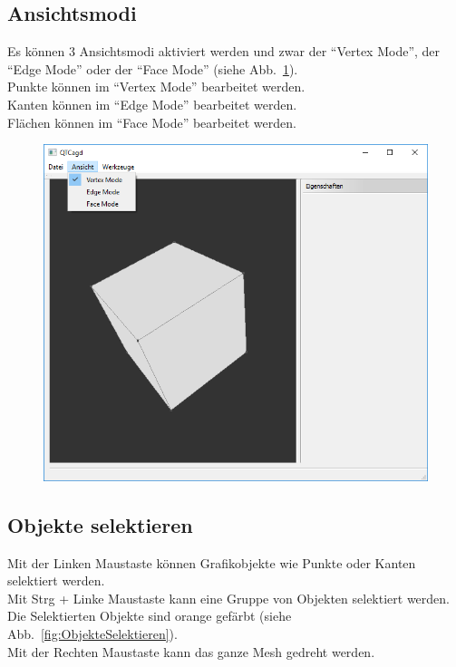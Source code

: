 \subsection{Ansichtsmodi}
Es können 3 Ansichtsmodi aktiviert werden und zwar der "`Vertex Mode"', der "`Edge Mode"' oder der "`Face Mode"' (siehe Abb.~\ref{fig:Ansichtsmodi}).\\
Punkte können im "`Vertex Mode"' bearbeitet werden.\\
Kanten können im "`Edge Mode"' bearbeitet werden.\\
Flächen können im "`Face Mode"' bearbeitet werden.

\begin{figure}[H]
	\centering
	\includegraphics[scale=0.5]{content/pictures/2-Ansichtsmodi}
	\caption{}
	\label{fig:Ansichtsmodi}
\end{figure}

\subsection{Objekte selektieren}
Mit der Linken Maustaste können Grafikobjekte wie Punkte oder Kanten selektiert werden.\\
Mit Strg + Linke Maustaste kann eine Gruppe von Objekten selektiert werden.\\
Die Selektierten Objekte sind orange gefärbt (siehe Abb.~\ref{fig:ObjekteSelektieren}).\\
Mit der Rechten Maustaste kann das ganze Mesh gedreht werden.\\


